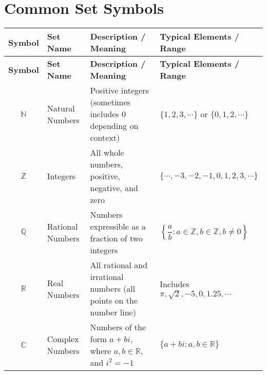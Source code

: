 \section*{Common Set Symbols}

\begin{customArrayStretch}{1.2}
\begin{longtable}{| c | p{2cm} | p{6cm} | p{6cm} |}


\hline
\textbf{Symbol} & \textbf{Set Name} & \textbf{Description / Meaning} & \textbf{Typical Elements / Range} \\
\hline
\endfirsthead

\hline
\textbf{Symbol} & \textbf{Set Name} & \textbf{Description / Meaning} & \textbf{Typical Elements / Range} \\
\hline
\endhead


\hline\endfoot
\hline\endlastfoot


$\mathbb{N}$ & Natural Numbers & Positive integers (sometimes includes 0 depending on context) & $\{1, 2, 3, \cdots\}$ or $\{0, 1, 2, \cdots\}$ \\ \cline{2-4}

$\mathbb{Z}$ & Integers & All whole numbers, positive, negative, and zero & $\{\cdots, -3, -2, -1, 0, 1, 2, 3, \cdots\}$ \\ \cline{2-4}

$\mathbb{Q}$ & Rational Numbers & Numbers expressible as a fraction of two integers & $\left\{\dfrac{a}{b} : a \in \mathbb{Z}, b \in \mathbb{Z}, b \neq 0 \right\}$ \\ \cline{2-4}

$\mathbb{R}$ & Real Numbers & All rational and irrational numbers (all points on the number line) & Includes $\pi, \sqrt{2}, -5, 0, 1.25, \cdots$ \\ \cline{2-4}

$\mathbb{C}$ & Complex Numbers & Numbers of the form $a + bi$, where $a, b \in \mathbb{R}$, and $i^2 = -1$ & $\{a + bi : a, b \in \mathbb{R}\}$ \\ \cline{2-4}



\end{longtable}
\end{customArrayStretch}




